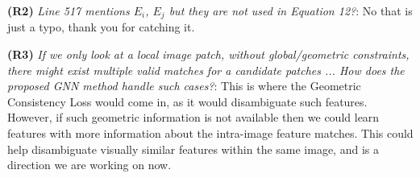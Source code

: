 \documentclass[10pt,twocolumn,letterpaper]{article}
\begin{document}
\textbf{(R2)} \textit{ Line 517 mentions $E_i$, $E_j$ but they are not used in Equation 12?}:
No that is just a typo, thank you for catching it.

\textbf{(R3)} \textit{If we only look at a local image patch, without global/geometric constraints, there might exist multiple valid matches for a candidate patches ... How does the proposed GNN method handle such cases?}:
This is where the Geometric Consistency Loss would come in, as it would disambiguate such features.
However, if such geometric information is not available then we could learn features with more information about the intra-image feature matches.
This could help disambiguate visually similar features within the same image, and is a direction we are working on now.






{\footnotesize


}
\end{document}
